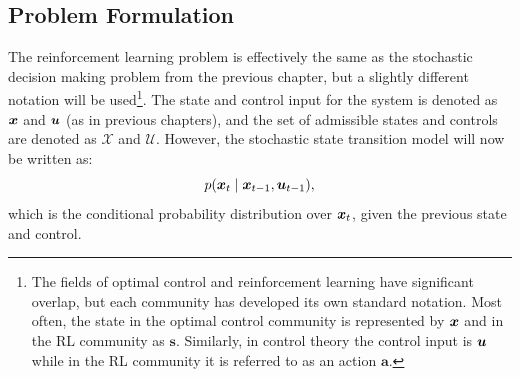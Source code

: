 \subsection{Problem Formulation}
The reinforcement learning problem is effectively the same as the stochastic decision making problem from the previous chapter, but a slightly different notation will be used\footnote{The fields of optimal control and reinforcement learning have significant overlap, but each community has developed its own standard notation. Most often, the state in the optimal control community is represented by $\bm{x}$ and in the RL community as $\bm{s}$. Similarly, in control theory the control input is $\bm{u}$ while in the RL community it is referred to as an action $\bm{a}$.}. The state and control input for the system is denoted as $\bm{x}$ and $\bm{u}$ (as in previous chapters), and the set of admissible states and controls are denoted as $\mathcal{X}$ and $\mathcal{U}$. However, the stochastic state transition model will now be written as:
\begin{equation} \label{eq:RLmodel}
p(\bm{x}_t \mid \bm{x}_{t-1}, \bm{u}_{t-1}),
\end{equation}
which is the conditional probability distribution over $\bm{x}_t$, given the previous state and control. 

